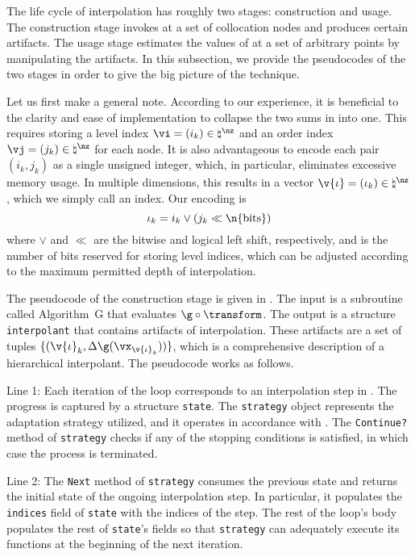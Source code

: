 The life cycle of interpolation has roughly two stages: construction and usage.
The construction stage invokes \g at a set of collocation nodes and produces
certain artifacts. The usage stage estimates the values of \g at a set of
arbitrary points by manipulating the artifacts. In this subsection, we provide
the pseudocodes of the two stages in order to give the big picture of the
technique.

Let us first make a general note. According to our experience, it is beneficial
to the clarity and ease of implementation to collapse the two sums in
 into one. This requires storing a level index $\vi = (i_k)
\in \natural^\nz$ and an order index $\vj = (j_k) \in \natural^\nz$ for each
node. It is also advantageous to encode each pair $(i_k, j_k)$ as a single
unsigned integer, which, in particular, eliminates excessive memory usage. In
multiple dimensions, this results in a vector $\v{\iota} = (\iota_k) \in
\natural^\nz$, which we simply call an index. Our encoding is
\[
  \iota_k = i_k \lor (j_k \ll \n{\mathrm{bits}})
\]
where $\lor$ and $\ll$ are the bitwise  and logical left shift,
respectively, and  is the number of bits reserved for storing
level indices, which can be adjusted according to the maximum permitted depth of
interpolation.

The pseudocode of the construction stage is given in .
The input is a subroutine called Algorithm~G that evaluates $\g \circ
\transform$. The output is a structure \texttt{interpolant} that contains
artifacts of interpolation. These artifacts are a set of tuples $\{
(\v{\iota}_k, \Delta\g(\vx_{\v{\iota}_k})) \}$, which is a comprehensive
description of a hierarchical interpolant. The pseudocode works as follows.

Line 1: Each iteration of the loop corresponds to an interpolation step \ls in
. The progress is captured by a structure \texttt{state}. The
\texttt{strategy} object represents the adaptation strategy utilized, and it
operates in accordance with . The \texttt{Continue?}
method of \texttt{strategy} checks if any of the stopping conditions is
satisfied, in which case the process is terminated.

Line 2: The \texttt{Next} method of \texttt{strategy} consumes the previous
state and returns the initial state of the ongoing interpolation step. In
particular, it populates the \texttt{indices} field of \texttt{state} with the
indices of the step. The rest of the loop's body populates the rest of
\texttt{state}'s fields so that \texttt{strategy} can adequately execute its
functions at the beginning of the next iteration.


